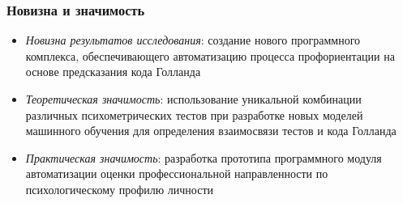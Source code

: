 \documentclass
  [ russian
  , aspectratio=169 %
  ] {beamer}
\begin{document}
\begin{frame}
    \frametitle{Новизна и значимость}
    \begin{itemize}
        \item \emph{Новизна результатов исследования}: создание нового программного комплекса, обеспечивающего автоматизацию процесса профориентации на основе предсказания кода Голланда
        \vspace{0.6em}
        \item \emph{Теоретическая значимость}: использование уникальной комбинации различных психометрических тестов при разработке новых моделей машинного обучения для определения взаимосвязи тестов и кода Голланда
        \vspace{0.6em}
        \item \emph{Практическая значимость}: разработка прототипа программного модуля автоматизации оценки профессиональной направленности по психологическому профилю личности
    \end{itemize}
\end{frame}
\end{document}
